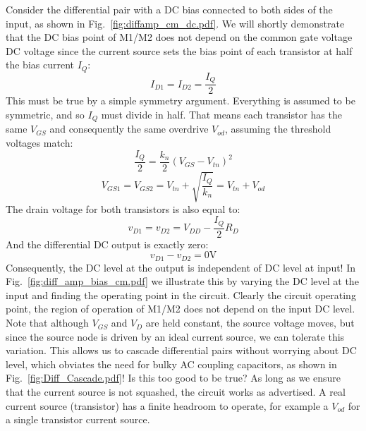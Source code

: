 Consider the differential pair with a DC bias connected to both sides of the input, as shown in Fig.~\ref{fig:diffamp_cm_dc.pdf}.  We will shortly demonstrate that the DC bias point of M1/M2 does not depend on the common gate voltage DC voltage since the current source sets the bias point of each transistor at half the bias current $I_Q$:
\begin{equation} 
	{I_{D1}} = {I_{D2}} = \frac{I_Q}{2}
\end{equation}
This must be true by a simple symmetry argument. Everything is assumed to be symmetric, and so $I_Q$ must divide in half.  That means each transistor has the same $V_{GS}$ and consequently the same overdrive $V_{od}$, assuming the threshold voltages match:
\begin{equation} 
	\frac{I_Q}{2} = \frac{{{k_n}}}{2}{\left( {{V_{GS}} - {V_{tn}}} \right)^2}
\end{equation}
\begin{equation}
 {V_{GS1}} = {V_{GS2}} = {V_{tn}} + \sqrt {\frac{I_Q}{{{k_n}}}}   = V_{tn} + V_{od}
\end{equation}
The drain voltage for both transistors is also equal to:
\begin{equation}
 {v_{D1}} = {v_{D2}} = {V_{DD}} - \frac{I_Q}{2}{R_D}  
\end{equation}
And the differential DC output is exactly zero:
\begin{equation}
 {v_{D1}} - {v_{D2}} = 0\mathrm{V}
\end{equation}
Consequently, the DC level at the output is independent of DC level at input! In Fig.~\ref{fig:diff_amp_bias_cm.pdf} we illustrate this by varying the DC level at the input and finding the operating point in the circuit.  Clearly the circuit operating point, the region of operation of M1/M2 does not depend on the input DC level.  Note that although $V_{GS}$ and $V_{D}$ are held constant, the source voltage moves, but since the source node is driven by an ideal current source, we can tolerate this variation.  This allows us to cascade differential pairs without worrying about DC level, which obviates the need for bulky AC coupling capacitors, as shown in Fig.~\ref{fig:Diff_Cascade.pdf}! Is this too good to be true?  As long as we ensure that the current source is not squashed, the circuit works as advertised.  A real current source (transistor) has a finite headroom to operate, for example a $V_{od}$ for a single transistor current source.
